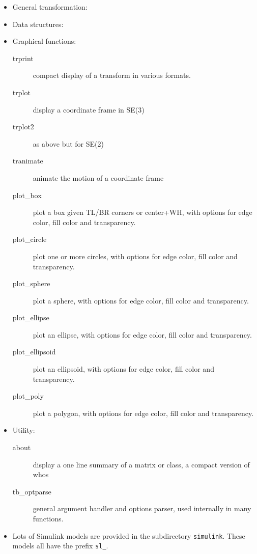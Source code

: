 \documentclass[a4paper]{report}
\begin{document}
\begin{itemize}
   \item General transformation:
 
\item Data structures:
 
\item Graphical functions:
  \begin{description}
 \item[trprint] compact display of a transform in various formats.
\item[trplot] display a coordinate frame in SE(3)
\item[trplot2] as above but for SE(2)
\item[tranimate] animate the motion of a coordinate frame
\item[plot\_box] plot a box given TL/BR corners or center+WH, with options for edge color, fill color and transparency.
\item[plot\_circle] plot one or more circles, with options for edge color, fill color and transparency.
\item[plot\_sphere] plot a sphere, with options for edge color, fill color and transparency.
\item[plot\_ellipse] plot an ellipse, with options for edge color, fill color and transparency.
\item[plot\_ellipsoid] plot an ellipsoid, with options for edge color, fill color and transparency.
\item[plot\_poly] plot a polygon, with options for edge color, fill color and transparency.
 \end{description}
 
 \item Utility:
  \begin{description}
\item[about] display a one line summary of a matrix or class, a compact version of whos
\item[tb\_optparse] general argument handler and options parser, used internally in many functions.
\end{description}
\item Lots of Simulink models are provided in the subdirectory \texttt{simulink}.  These models all have the prefix \texttt{sl\_}.
\end{itemize}
\end{document}
